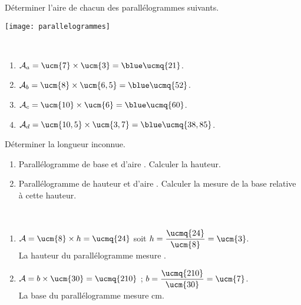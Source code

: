 \begin{colonne*exercice}
\bigskip


\begin{exercice} %
   Déterminer l'aire de chacun des parallélogrammes suivants.
   \begin{center}
      \texttt{[image: parallelogrammes]}
   \end{center}
\end{exercice}

\begin{corrige}
   \ \\ [-5mm]
   \begin{enumerate}
      \item $\mathcal{A}_a =\ucm{7}\times\ucm{3} =\blue \ucmq{21}$.
      \item $\mathcal{A}_b =\ucm{8}\times\ucm{6,5} =\blue \ucmq{52}$.
      \item $\mathcal{A}_c =\ucm{10}\times\ucm{6} =\blue \ucmq{60}$.
      \item $\mathcal{A}_d =\ucm{10,5}\times\ucm{3,7} =\blue \ucmq{38,85}$.
   \end{enumerate}
\end{corrige}

\bigskip


\begin{exercice} %
   Déterminer la longueur inconnue.
   \begin{enumerate}
      \item Parallélogramme de base  et d'aire . Calculer la hauteur.
      \item Parallélogramme de hauteur  et d'aire . Calculer la mesure de la base relative à cette hauteur.
   \end{enumerate}
\end{exercice}

\begin{corrige}
   \ \\ [-5mm]
   \begin{enumerate}
      \item $\mathcal{A} =\ucm{8}\times h =\ucmq{24}$ soit $h =\dfrac{\ucmq{24}}{\ucm{8}} =\ucm{3}$. \\ [1mm]
         La {\blue hauteur} du parallélogramme mesure {\blue {}}. \smallskip
      \item $\mathcal{A} =b\times\ucm{30} =\ucmq{210}$ ; $b =\dfrac{\ucmq{210}}{\ucm{30}} =\ucm{7}$. \\ [1mm]
      La {\blue base} du parallélogramme mesure { cm}.
   \end{enumerate}
\end{corrige}


\end{colonne*exercice}
